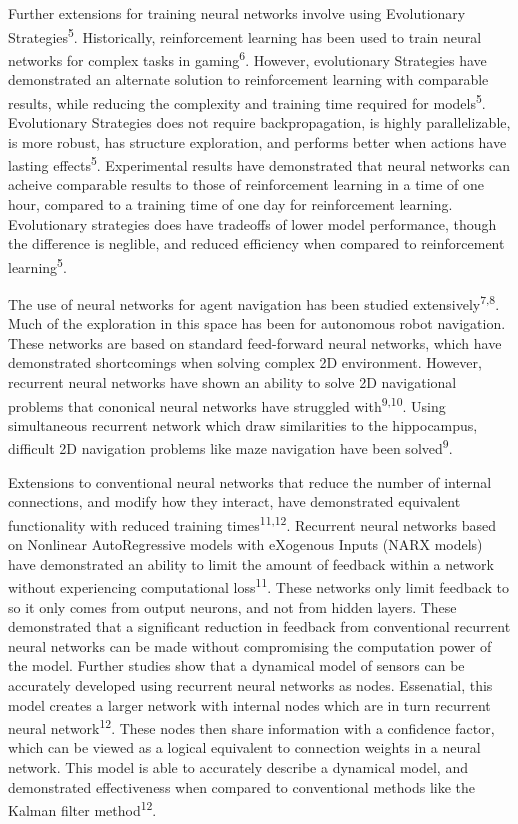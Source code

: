 \documentclass[journal]{IEEEtran}
\begin{document}
    Further extensions for training neural networks involve using Evolutionary Strategies\textsuperscript{5}. Historically, reinforcement learning has been used to train neural networks for complex tasks in gaming\textsuperscript{6}. However, evolutionary Strategies
    have demonstrated an alternate solution to reinforcement learning with comparable results, while reducing the complexity and training time required for models\textsuperscript{5}. Evolutionary Strategies does not require backpropagation, is highly parallelizable, is more robust, 
    has structure exploration, and performs better when actions have lasting effects\textsuperscript{5}. Experimental results have demonstrated that neural networks can acheive comparable results to those of reinforcement learning in a time of one hour, compared to a training
    time of one day for reinforcement learning. Evolutionary strategies does have tradeoffs of lower model performance, though the difference is neglible, and reduced efficiency when compared to reinforcement learning\textsuperscript{5}.

    The use of neural networks for agent navigation has been studied extensively\textsuperscript{7,8}. Much of the exploration in this space has been for autonomous robot navigation. These networks are based on standard feed-forward neural networks, which have
    demonstrated shortcomings when solving complex 2D environment. However, recurrent neural networks have shown an ability to solve 2D navigational problems that cononical neural networks have struggled with\textsuperscript{9,10}. Using simultaneous recurrent network
    which draw similarities to the hippocampus, difficult 2D navigation problems like maze navigation have been solved\textsuperscript{9}.

    Extensions to conventional neural networks that reduce the number of internal connections, and modify how they interact, have demonstrated equivalent functionality with reduced training times\textsuperscript{11,12}. Recurrent neural networks based on 
    Nonlinear AutoRegressive models with eXogenous Inputs (NARX models) have demonstrated an ability to limit the amount of feedback within a network without experiencing computational loss\textsuperscript{11}. These networks only limit feedback to so it only comes 
    from output neurons, and not from hidden layers. These demonstrated that a significant reduction in feedback from conventional recurrent neural networks can be made without compromising the computation power of the model. Further studies show that a dynamical model 
    of sensors can be accurately developed using recurrent neural networks as nodes. Essenatial, this model creates a larger network with internal nodes which are in turn recurrent neural network\textsuperscript{12}. These nodes then share information with a confidence factor, which can
    be viewed as a logical equivalent to connection weights in a neural network. This model is able to accurately describe a dynamical model, and demonstrated effectiveness when compared to conventional methods like the Kalman filter method\textsuperscript{12}. 
\end{document}
